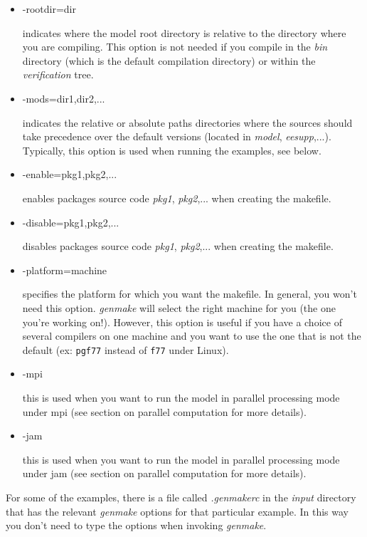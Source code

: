 \begin{itemize}
\item -rootdir=dir

indicates where the model root directory is relative to the directory where
you are compiling. This option is not needed if you compile in the \textit{%
bin} directory (which is the default compilation directory) or within the 
\textit{verification} tree.

\item -mods=dir1,dir2,...

indicates the relative or absolute paths directories where the sources
should take precedence over the default versions (located in \textit{model}, 
\textit{eesupp},...). Typically, this option is used when running the
examples, see below.

\item -enable=pkg1,pkg2,...

enables packages source code \textit{pkg1}, \textit{pkg2},... when creating
the makefile.

\item -disable=pkg1,pkg2,...

disables packages source code \textit{pkg1}, \textit{pkg2},... when creating
the makefile.

\item -platform=machine

specifies the platform for which you want the makefile. In general, you
won't need this option. \textit{genmake} will select the right machine for
you (the one you're working on!). However, this option is useful if you have
a choice of several compilers on one machine and you want to use the one
that is not the default (ex: \texttt{pgf77} instead of \texttt{f77} under
Linux).

\item -mpi

this is used when you want to run the model in parallel processing mode
under mpi (see section on parallel computation for more details).

\item -jam

this is used when you want to run the model in parallel processing mode
under jam (see section on parallel computation for more details).
\end{itemize}

For some of the examples, there is a file called \textit{.genmakerc} in the 
\textit{input} directory that has the relevant \textit{genmake} options for
that particular example. In this way you don't need to type the options when
invoking \textit{genmake}.

